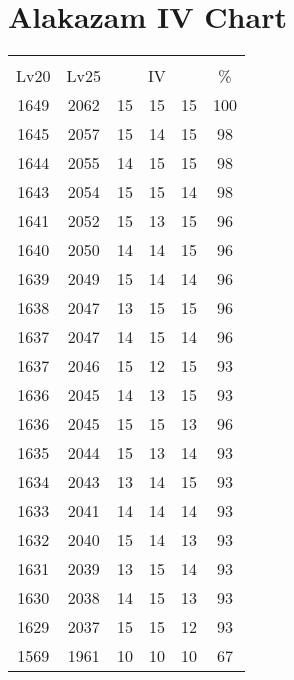 \documentclass{article}%
\begin{document}
%
\normalsize%
\section{Alakazam IV Chart}%
\label{sec:Alakazam IV Chart}%
\renewcommand{\arraystretch}{1.5}%
\begin{tabular}{|c|c|c|c|c|c|}%
\hline%
\multicolumn{6}{|c|}{\textcolor{white}{ 
\linebreak{Alakazam}
}%
\cellcolor{black}}\\%
\multicolumn{1}{|c}{Lv20}&\multicolumn{1}{c|}{Lv25}&\multicolumn{3}{c|}{IV}&\multicolumn{1}{|c|}{\%}\\%
\hline%
\rowcolor{color100}%
1649&2062&15&15&15&100\\%
\hline%
\rowcolor{color98}%
1645&2057&15&14&15&98\\%
\hline%
\rowcolor{color98}%
1644&2055&14&15&15&98\\%
\hline%
\rowcolor{color98}%
1643&2054&15&15&14&98\\%
\hline%
\rowcolor{color96}%
1641&2052&15&13&15&96\\%
\hline%
\rowcolor{color96}%
1640&2050&14&14&15&96\\%
\hline%
\rowcolor{color96}%
1639&2049&15&14&14&96\\%
\hline%
\rowcolor{color96}%
1638&2047&13&15&15&96\\%
\hline%
\rowcolor{color96}%
1637&2047&14&15&14&96\\%
\hline%
\rowcolor{color93}%
1637&2046&15&12&15&93\\%
\hline%
\rowcolor{color93}%
1636&2045&14&13&15&93\\%
\hline%
\rowcolor{color96}%
1636&2045&15&15&13&96\\%
\hline%
\rowcolor{color93}%
1635&2044&15&13&14&93\\%
\hline%
\rowcolor{color93}%
1634&2043&13&14&15&93\\%
\hline%
\rowcolor{color93}%
1633&2041&14&14&14&93\\%
\hline%
\rowcolor{color93}%
1632&2040&15&14&13&93\\%
\hline%
\rowcolor{color93}%
1631&2039&13&15&14&93\\%
\hline%
\rowcolor{color93}%
1630&2038&14&15&13&93\\%
\hline%
\rowcolor{color93}%
1629&2037&15&15&12&93\\%
\hline%
\rowcolor{color91}%
1569&1961&10&10&10&67\\%
\end{tabular}

%
\end{document}
